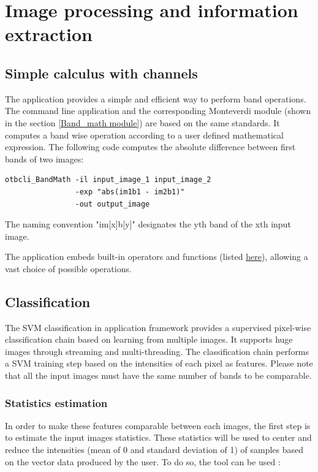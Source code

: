 \section{Image processing and information extraction}\label{sec:improc}

\subsection{Simple calculus with channels}\label{ssec:calculus}

The  application provides a simple and efficient 
way to perform band operations. The command line application and the 
corresponding Monteverdi module (shown in the section \ref{Band_math module}) 
are based on the same standards. It computes a band wise operation according 
to a user defined mathematical expression. The following code computes the 
absolute difference between first bands of two images:

\begin{verbatim}
otbcli_BandMath -il input_image_1 input_image_2 
                -exp "abs(im1b1 - im2b1)"
                -out output_image
\end{verbatim}

The naming convention "im[x]b[y]" designates the yth band of the xth input image.

The  application embeds built-in operators and functions 
(listed \href{http://muparser.sourceforge.net/mup_features.html#idDef2}{here}), 
allowing a vast choice of possible operations. 

\subsection{Classification}\label{ssec:classification}

The SVM classification in application framework provides a supervised pixel-wise 
classification chain based on learning from multiple images. It supports huge 
images through streaming and multi-threading.
The classification chain performs a SVM training step based on the intensities 
of each pixel as features. Please note that all the input images must have the 
same number of bands to be comparable.

\subsubsection{Statistics estimation}
In order to make these features comparable between each images, the first step 
is to estimate the input images statistics. These statistics will be used to 
center and reduce the intensities (mean of 0 and standard deviation of 1) of 
samples based on the vector data produced by the user. To do so, the 
 tool can be used :

